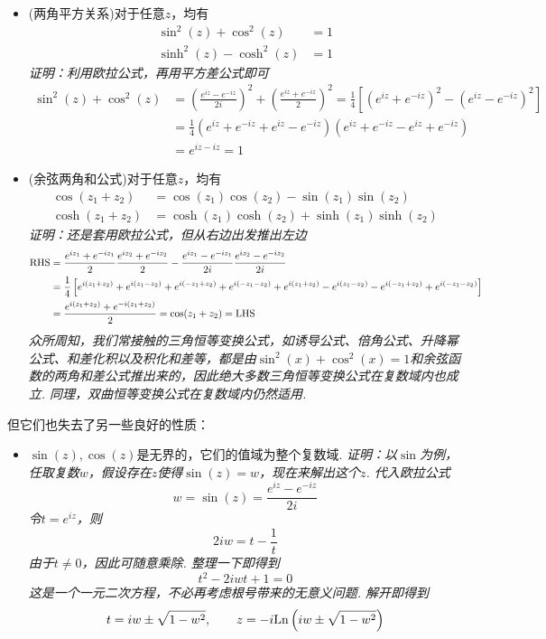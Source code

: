 \begin{itemize}
    \item [(1)] (两角平方关系)对于任意\(z\)，均有
    \begin{align*}
        \sin^2(z) + \cos^2(z) &= 1 \\
        \sinh^2(z) - \cosh^2(z) &= 1
    \end{align*}
    \textit{
        证明：利用欧拉公式，再用平方差公式即可
    }
    \begin{align*}
        \sin^2(z)+\cos^2(z) &= \left(\frac{e^{iz}-e^{-iz}}{2i}\right)^2+\left(\frac{e^{iz}+e^{-iz}}{2}\right)^2 = \frac{1}{4}\left[(e^{iz}+e^{-iz})^2-(e^{iz}-e^{-iz})^2\right] \\
        &= \frac{1}{4}(e^{iz}+e^{-iz}+e^{iz}-e^{-iz})(e^{iz}+e^{-iz}-e^{iz}+e^{-iz}) \\
        &= e^{iz-iz}=1
    \end{align*}
    \item [(2)] (余弦两角和公式)对于任意\(z\)，均有
    \begin{align*}
        \cos(z_1+z_2) &= \cos(z_1)\cos(z_2)-\sin(z_1)\sin(z_2) \\
        \cosh(z_1+z_2) &= \cosh(z_1)\cosh(z_2)+\sinh(z_1)\sinh(z_2)
    \end{align*}
    \textit{
        证明：还是套用欧拉公式，但从右边出发推出左边
    }
    \begin{align*}
        \textrm{RHS} &= \frac{e^{iz_1}+e^{-iz_1}}{2}\frac{e^{iz_2}+e^{-iz_2}}{2} - \frac{e^{iz_1}-e^{-iz_1}}{2i}\frac{e^{iz_2}-e^{-iz_2}}{2i} \\
        &= \frac{1}{4}\left[e^{i(z_1+z_2)}+e^{i(z_1-z_2)}+e^{i(-z_1+z_2)}+e^{i(-z_1-z_2)}+e^{i(z_1+z_2)}-e^{i(z_1-z_2)}-e^{i(-z_1+z_2)}+e^{i(-z_1-z_2)}\right] \\
        &= \frac{e^{i(z_1+z_2)}+e^{-i(z_1+z_2)}}{2} = \cos(z_1+z_2) = {\rm LHS}
    \end{align*}
    \textit{
        众所周知，我们常接触的三角恒等变换公式，如诱导公式、倍角公式、升降幂公式、和差化积以及积化和差等，都是由\(\sin^2(x)+\cos^2(x)=1\)和余弦函数的两角和差公式推出来的，因此绝大多数三角恒等变换公式在复数域内也成立. 同理，双曲恒等变换公式在复数域内仍然适用.
    }
\end{itemize}
但它们也失去了另一些良好的性质：
\begin{itemize}
    \item [(1)] \(\sin(z),\cos(z)\)是无界的，它们的值域为整个复数域.
    \newline
    \textit{
        证明：以\(\sin\)为例，任取复数\(w\)，假设存在\(z\)使得\(\sin(z)=w\)，现在来解出这个\(z\). 代入欧拉公式
        \[w=\sin(z)=\frac{e^{iz}-e^{-iz}}{2i}\]
        令\(t=e^{iz}\)，则
        \[2iw=t-\frac{1}{t}\]
        由于\(t\neq 0\)，因此可随意乘除. 整理一下即得到
        \[t^2-2iwt+1=0\]
        这是一个一元二次方程，不必再考虑根号带来的无意义问题. 解开即得到
        \[t=iw \pm \sqrt{1-w^2}, \qquad z=-i{\rm Ln}\left(iw \pm \sqrt{1-w^2}\right)\]
    }
\end{itemize}

